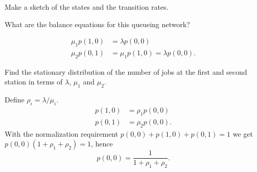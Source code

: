 \begin{exercise}[201704]{2}
Make a sketch of the states and the transition rates.
\begin{solution}
  \begin{center}
    
  \end{center}
\end{solution}
\end{exercise}

\begin{exercise}[201704]{2}
What are the balance equations for this queueing network?
\begin{solution}
  \begin{align*}
    \mu_1 p(1,0) &= \lambda p(0,0) \\
    \mu_2 p(0,1) &= \mu_1 p(1,0) = \lambda p(0,0).
  \end{align*}
\end{solution}
\end{exercise}


\begin{exercise}[201704]{2}
  Find the stationary distribution of the number of jobs at the first
  and second station in terms of $\lambda$, $\mu_1$ and $\mu_2$.
\begin{solution}
Define $\rho_i=\lambda/\mu_i$.
  \begin{align*}
     p(1,0) &= \rho_1 p(0,0) \\
     p(0,1) &= \rho_2 p(0,0).
  \end{align*}
With the normalization requirement $p(0,0)+p(1,0)+p(0,1) = 1$ we get
$p(0,0)(1 + \rho_1 + \rho_2) = 1$, hence
\begin{equation*}
p(0,0)=\frac1{1 + \rho_1 + \rho_2}.
\end{equation*}
\end{solution}
\end{exercise}

